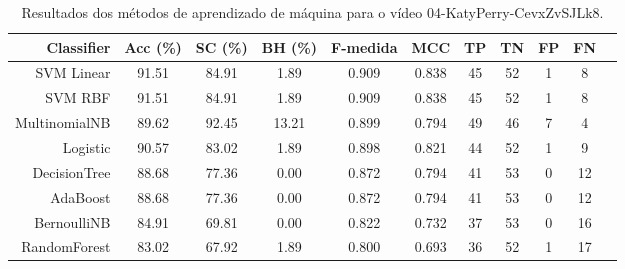 \begin{table}[!htb]
\centering
\caption{Resultados dos métodos de aprendizado de máquina para o vídeo 04-KatyPerry-CevxZvSJLk8.}
\label{tab:04-KatyPerry-CevxZvSJLk8}
\begin{tabular}{r|c|c|c|c|c|c|c|c|c|c}
\hline\hline
Classifier & Acc (\%) & SC (\%) & BH (\%) & F-medida & MCC & TP & TN & FP & FN \\ \hline
SVM Linear & 91.51 & 84.91 & 1.89 & 0.909 & 0.838 & 45 & 52 & 1 & 8 \\ 
SVM RBF & 91.51 & 84.91 & 1.89 & 0.909 & 0.838 & 45 & 52 & 1 & 8 \\ 
MultinomialNB & 89.62 & 92.45 & 13.21 & 0.899 & 0.794 & 49 & 46 & 7 & 4 \\ 
Logistic & 90.57 & 83.02 & 1.89 & 0.898 & 0.821 & 44 & 52 & 1 & 9 \\ 
DecisionTree & 88.68 & 77.36 & 0.00 & 0.872 & 0.794 & 41 & 53 & 0 & 12 \\ 
AdaBoost & 88.68 & 77.36 & 0.00 & 0.872 & 0.794 & 41 & 53 & 0 & 12 \\ 
BernoulliNB & 84.91 & 69.81 & 0.00 & 0.822 & 0.732 & 37 & 53 & 0 & 16 \\ 
RandomForest & 83.02 & 67.92 & 1.89 & 0.800 & 0.693 & 36 & 52 & 1 & 17 \\ 
\hline\hline
\end{tabular}
\end{table}
